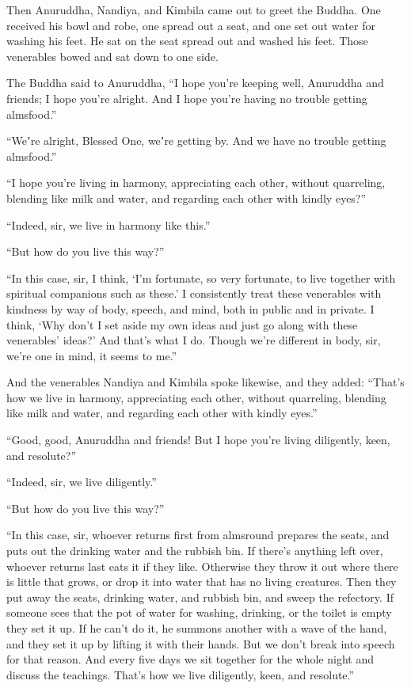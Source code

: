 \documentclass[12pt,openany]{book}%
\begin{document}
Then Anuruddha, Nandiya, and Kimbila came out to greet the Buddha. One received his bowl and robe, one spread out a seat, and one set out water for washing his feet. He sat on the seat spread out and washed his feet. Those venerables bowed and sat down to one side. 

The Buddha said to Anuruddha, “I hope you’re keeping well, Anuruddha and friends; I hope you’re alright. And I hope you’re having no trouble getting almsfood.” 

“Weʼre alright, Blessed One, weʼre getting by. And we have no trouble getting almsfood.” 

“I hope you’re living in harmony, appreciating each other, without quarreling, blending like milk and water, and regarding each other with kindly eyes?” 

“Indeed, sir, we live in harmony like this.” 

“But how do you live this way?” 

“In this case, sir, I think, ‘I’m fortunate, so very fortunate, to live together with spiritual companions such as these.’ I consistently treat these venerables with kindness by way of body, speech, and mind, both in public and in private. I think, ‘Why don’t I set aside my own ideas and just go along with these venerables’ ideas?’ And that’s what I do. Though we’re different in body, sir, we’re one in mind, it seems to me.” 

And the venerables Nandiya and Kimbila spoke likewise, and they added: “That’s how we live in harmony, appreciating each other, without quarreling, blending like milk and water, and regarding each other with kindly eyes.” 

“Good, good, Anuruddha and friends! But I hope you’re living diligently, keen, and resolute?” 

“Indeed, sir, we live diligently.” 

“But how do you live this way?” 

“In this case, sir, whoever returns first from almsround prepares the seats, and puts out the drinking water and the rubbish bin. If there’s anything left over, whoever returns last eats it if they like. Otherwise they throw it out where there is little that grows, or drop it into water that has no living creatures. Then they put away the seats, drinking water, and rubbish bin, and sweep the refectory. If someone sees that the pot of water for washing, drinking, or the toilet is empty they set it up. If he can’t do it, he summons another with a wave of the hand, and they set it up by lifting it with their hands. But we don’t break into speech for that reason. And every five days we sit together for the whole night and discuss the teachings. That’s how we live diligently, keen, and resolute.” 
\end{document}
